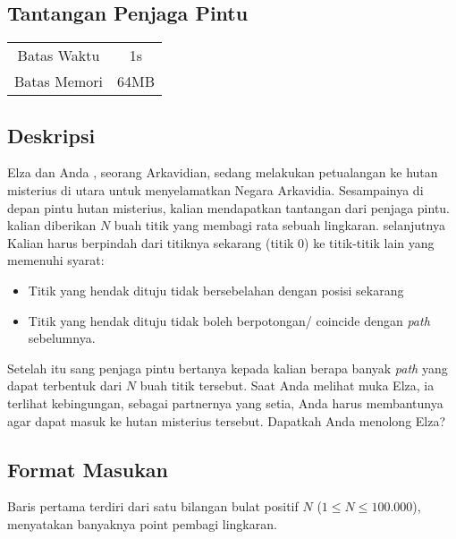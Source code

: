\documentclass{article}
\begin{document}
\begin{center}
    \section*{Tantangan Penjaga Pintu} %

    \begin{tabular}{ | c c | }
        \hline
        Batas Waktu  & 1s \\    %
        Batas Memori & 64MB \\  %
        \hline
    \end{tabular}
\end{center}

\subsection*{Deskripsi}

Elza dan Anda , seorang Arkavidian, sedang melakukan petualangan ke hutan misterius di utara untuk menyelamatkan Negara Arkavidia.
Sesampainya di depan pintu hutan misterius, kalian mendapatkan tantangan dari penjaga pintu.
kalian diberikan $N$ buah titik yang membagi rata sebuah lingkaran. selanjutnya Kalian harus berpindah dari titiknya
sekarang (titik 0) ke titik-titik lain yang memenuhi syarat:

\begin{itemize}
    \setlength\itemsep{0pt}
    \item Titik yang hendak dituju tidak bersebelahan dengan posisi sekarang
    \item Titik yang hendak dituju tidak boleh berpotongan/ coincide dengan \textit{path} sebelumnya.
\end{itemize}

Setelah itu sang penjaga pintu bertanya kepada kalian berapa banyak \textit{path} yang dapat terbentuk dari $N$ buah titik tersebut.
Saat Anda melihat muka Elza, ia terlihat kebingungan, sebagai partnernya yang setia, Anda harus membantunya 
agar dapat masuk ke hutan misterius tersebut. Dapatkah Anda menolong Elza?

\subsection*{Format Masukan}
Baris pertama terdiri dari satu bilangan bulat positif $N$ ($1 \leq N \leq 100.000$), menyatakan banyaknya point pembagi lingkaran.
\end{document}
